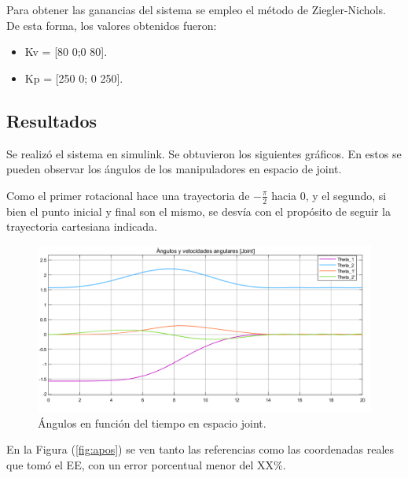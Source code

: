 
Para obtener las ganancias del sistema se empleo el método de Ziegler-Nichols. De esta forma, los valores obtenidos fueron:
\begin{itemize}
	\item Kv = [80 0;0 80].
	\item Kp = [250 0; 0 250].
\end{itemize}

\subsection{Resultados}
Se realizó el sistema en simulink. Se obtuvieron los siguientes gráficos.
En estos se pueden observar los ángulos de los manipuladores en espacio de joint.

Como el primer rotacional hace una trayectoria de $-\frac{\pi}{2}$ hacia $0$, y el segundo, si bien el punto inicial y final son el mismo, se desvía con el propósito de seguir la trayectoria cartesiana indicada.

\begin{figure}[H]
	\centering
	\includegraphics[width=0.8\linewidth]{ImagenesControl de posición no lineal/1_3_a}
	\caption{Ángulos en función del tiempo en espacio joint.}	
	\label{fig:athetas}
\end{figure}

En la Figura (\ref{fig:apos}) se ven tanto las referencias como las coordenadas reales que tomó el EE, con un error porcentual menor del XX$\%$. 


